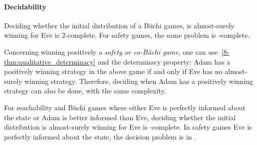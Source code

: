 \paragraph{Decidability}

\begin{theorem}
\label{th:main}
Deciding whether the initial distribution of a B{\"u}chi games,
is almost-surely winning for Eve is
2\EXPTIME-complete.
For safety games, the same problem is \EXPTIME-complete.
\end{theorem}

Concerning winning positively a {\em safety or co-B{\"u}chi game}, one
can use~\cref{8-thm:qualitative_determinacy} and the determinacy property: Adam
has a positively winning strategy in the above game if and only if
Eve has no almost-surely winning strategy. Therefore, deciding
when Adam has a positively winning strategy can also be done, with
the same complexity.


\begin{theorem}
\label{th:main2}
For reachability and B{\"u}chi games where either Eve is perfectly informed about the state
or Adam is
better informed than Eve, deciding whether the initial distribution is
almost-surely winning for Eve is
\EXPTIME-complete.
In safety games
Eve is perfectly
informed {about the state}, the decision problem is in \PTIME.
\end{theorem}

